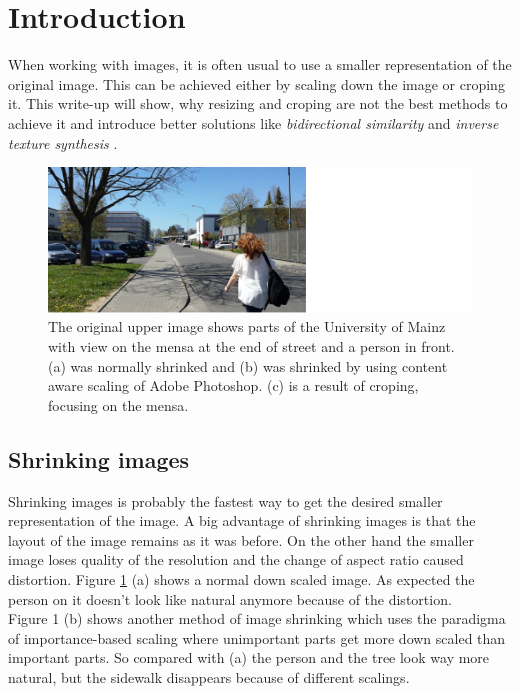 \section{Introduction}
When working with images, it is often usual to use a smaller representation of the original image.
This can be achieved either by scaling down the image or croping it. This write-up will show, why resizing and croping are not the best methods to achieve it and introduce better solutions like \textit{bidirectional similarity} \cite{bisi} and \textit{inverse texture synthesis} \cite{its}. 

\begin{figure}[h]
\centering
\includegraphics[scale=0.9]{img/ShrinkingCropping}
\caption[Image shrinking]{The original upper image shows parts of the University of Mainz with view on
the mensa at the end of street and a person in front. (a) was normally shrinked and (b) was shrinked by using content aware scaling of Adobe Photoshop\footnotemark. (c) is a result of croping, focusing on the mensa.}
\label{fig:Image shrinking}
\end{figure}


\subsection{Shrinking images}
Shrinking images is probably the fastest way to get the desired smaller representation of the image. A big advantage of shrinking images is that the layout of the image remains as it was before. On the other hand the smaller image loses quality of the resolution and the change of aspect ratio caused distortion. Figure \ref{fig:Image shrinking} (a) shows a normal down scaled image. As expected the person on it doesn't look like natural anymore because of the distortion.\\
Figure 1 (b) shows another method of image shrinking which uses the paradigma of importance-based scaling where unimportant parts get more down scaled than important parts. So compared with (a) the person and the tree look way more natural, but the sidewalk disappears because of different scalings.



